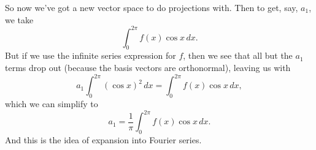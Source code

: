 So now we've got a new vector space to do projections with. Then to get, say, $a_1$, we take
\[ \int_0^{2\pi} f(x)\cos x \, dx. \]
But if we use the infinite series expression for $f$, then we see that all but the $a_1$ terms drop out (because the basis vectors are orthonormal), leaving us with
\[ a_1 \int_0^{2\pi} (\cos x)^2 \, dx = \int_0^{2\pi} f(x)\cos x \, dx, \]
which we can simplify to
\[ a_1 = \frac 1 \pi \int_0^{2\pi} f(x)\cos x \, dx. \]
And this is the idea of expansion into Fourier series.